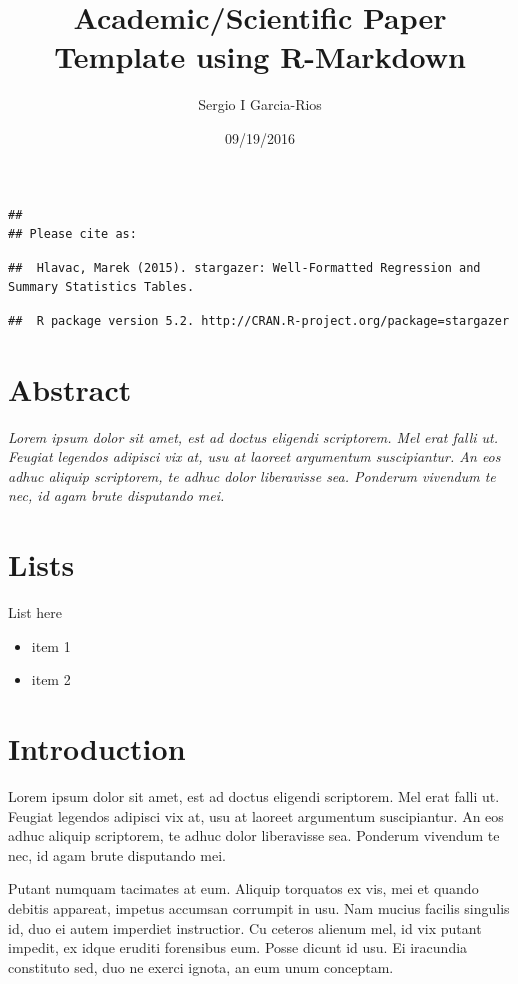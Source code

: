 \documentclass[]{article}
\title{Academic/Scientific Paper Template using R-Markdown}
\author{Sergio I Garcia-Rios}
\date{09/19/2016}
\providecommand{\tightlist}{%
  \setlength{\itemsep}{0pt}\setlength{\parskip}{0pt}}
\begin{document}
\maketitle

\begin{verbatim}
## 
## Please cite as:
\end{verbatim}

\begin{verbatim}
##  Hlavac, Marek (2015). stargazer: Well-Formatted Regression and Summary Statistics Tables.
\end{verbatim}

\begin{verbatim}
##  R package version 5.2. http://CRAN.R-project.org/package=stargazer
\end{verbatim}

\section{Abstract}\label{abstract}

\emph{Lorem ipsum dolor sit amet, est ad doctus eligendi scriptorem. Mel
erat falli ut. Feugiat legendos adipisci vix at, usu at laoreet
argumentum suscipiantur. An eos adhuc aliquip scriptorem, te adhuc dolor
liberavisse sea. Ponderum vivendum te nec, id agam brute disputando
mei.}

\section{Lists}\label{lists}

List here

\begin{itemize}
\tightlist
\item
  item 1
\item
  item 2
\end{itemize}

\section{Introduction}\label{introduction}

Lorem ipsum dolor sit amet, est ad doctus eligendi scriptorem. Mel erat
falli ut. Feugiat legendos adipisci vix at, usu at laoreet argumentum
suscipiantur. An eos adhuc aliquip scriptorem, te adhuc dolor
liberavisse sea. Ponderum vivendum te nec, id agam brute disputando mei.

Putant numquam tacimates at eum. Aliquip torquatos ex vis, mei et quando
debitis appareat, impetus accumsan corrumpit in usu. Nam mucius facilis
singulis id, duo ei autem imperdiet instructior. Cu ceteros alienum mel,
id vix putant impedit, ex idque eruditi forensibus eum. Posse dicunt id
usu. Ei iracundia constituto sed, duo ne exerci ignota, an eum unum
conceptam.
\end{document}
